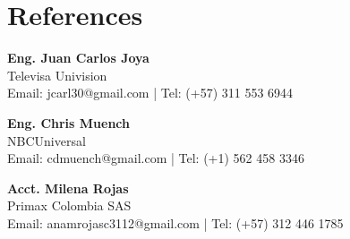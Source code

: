 \documentclass[11pt,a4paper]{article}
\begin{document}
\section*{References}
\textbf{Eng. Juan Carlos Joya} \\
Televisa Univision \\
Email: jcarl30@gmail.com | Tel: (+57) 311 553 6944

\textbf{Eng. Chris Muench} \\
NBCUniversal \\
Email: cdmuench@gmail.com | Tel: (+1) 562 458 3346

\textbf{Acct. Milena Rojas} \\
Primax Colombia SAS \\
Email: anamrojasc3112@gmail.com | Tel: (+57) 312 446 1785
\end{document}
